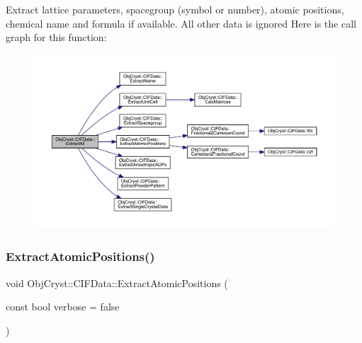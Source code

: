 Extract lattice parameters, spacegroup (symbol or number), atomic positions, chemical name and formula if available. All other data is ignored Here is the call graph for this function\+:
\nopagebreak
\begin{figure}[H]
\begin{center}
\leavevmode
\includegraphics[width=350pt]{class_obj_cryst_1_1_c_i_f_data_a406e1448ca864b4d679edde83c6351ab_cgraph}
\end{center}
\end{figure}
\mbox{\label{class_obj_cryst_1_1_c_i_f_data_ada558a6f28454cae868aef9710a785d7}} 
\subsubsection{\texorpdfstring{ExtractAtomicPositions()}{ExtractAtomicPositions()}}
{\footnotesize\ttfamily void Obj\+Cryst\+::\+C\+I\+F\+Data\+::\+Extract\+Atomic\+Positions (\begin{DoxyParamCaption}\item[{const bool}]{verbose = {\ttfamily false} }\end{DoxyParamCaption})}

